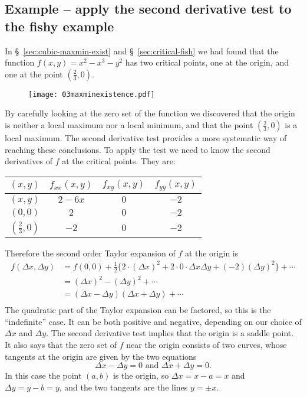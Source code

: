 \subsection{Example -- apply the second derivative test to the fishy example}
In \S~\ref{sec:cubic-maxmin-exist} and \S~\ref{sec:critical-fish} we had
found that the function $f(x, y) = x^2-x^3-y^2$ has two critical points,
one at the origin, and one at the point $(\frac 23, 0)$.
\begin{figure}[h]
\texttt{[image: 03maxminexistence.pdf]}
\end{figure}
By carefully
looking at the zero set of the function we discovered that the origin is
neither a local maximum nor a local minimum, and that the point $(\frac 23,
0)$ is a local maximum.  The second derivative test provides a more
systematic way of reaching these conclusions.  To apply the test we need to
know the second derivatives of $f$ at the critical points.  They are:
\begin{center}
  \begin{tabular}{cccc}\hline
    \rule[-6pt]{0pt}{16pt}
    $(x, y)$  &$f_{xx}(x, y)$ &$f_{xy}(x, y)$ &$f_{yy}(x, y)$ \\\hline
    \rule[-4pt]{0pt}{16pt}
    $(x, y)$ & $ 2-6x $  & $0$  &  $-2$ \\
    \rule[-4pt]{0pt}{14pt}
    $(0,0)$ & $2$ & $0$ & $-2$ \\
    \rule[-6pt]{0pt}{16pt}
    $(\tfrac23, 0)$ & $-2$ & $0$ &$-2$\\\hline
  \end{tabular}
\end{center}

Therefore the second order Taylor expansion of $f$ at the origin is
\begin{align*}
  f(\Delta x, \Delta y)
  &= f(0,0) + \tfrac12 \bigl\{ 2\cdot (\Delta x)^2 +
  2\cdot 0\cdot \Delta x \Delta y + (-2) (\Delta y)^2 \bigr\} +\cdots\\
  &=  (\Delta x)^2 - (\Delta y)^2 + \cdots\\
  &=  (\Delta x - \Delta y)(\Delta x+\Delta y) + \cdots\\
\end{align*}
The quadratic part of the Taylor expansion can be factored, so this is the ``indefinite'' case.  It can be both positive and negative, depending on our choice of $\Delta x$ and $\Delta y$.  The second derivative test implies that the origin is a saddle point. It also says that the zero set of $f$ near the origin consists of two curves, whose tangents at the origin are given by the two equations
\begin{equation}
\Delta x-\Delta y =0 \text{ and } \Delta x+\Delta y = 0.
\label{eq:second-deriv-test-fishy-at-origin}
\end{equation} 
In this case the point $(a, b)$ is the origin, so $\Delta x = x-a = x$
and $\Delta y = y-b = y$, and the two tangents are the lines $y=\pm
x$.


